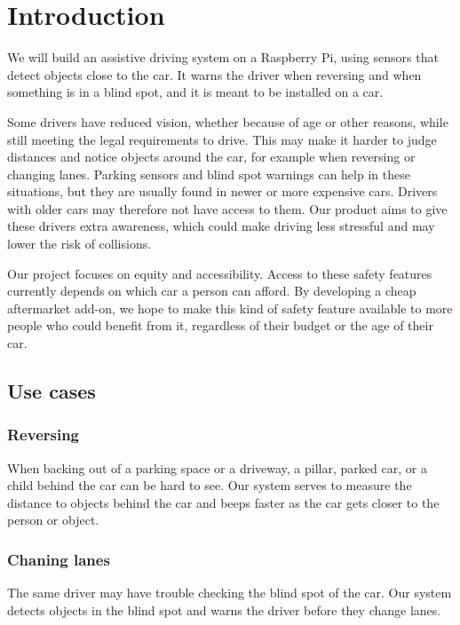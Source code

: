 \documentclass[12pt]{article}
\begin{document}
\thispagestyle{empty} %
\newpage
\tableofcontents
\clearpage
\section{Introduction}

We will build an assistive driving system on a Raspberry Pi, using sensors that detect objects close to the car. It warns the driver when reversing and when something is in a blind spot, and it is meant to be installed on a car.

Some drivers have reduced vision, whether because of age or other reasons, while still meeting the legal requirements to drive. This may make it harder to judge distances and notice objects around the car, for example when reversing or changing lanes. Parking sensors and blind spot warnings can help in these situations, but they are usually found in newer or more expensive cars. Drivers with older cars may therefore not have access to them. Our product aims to give these drivers extra awareness, which could make driving less stressful and may lower the risk of collisions.

Our project focuses on equity and accessibility. Access to these safety features currently depends on which car a person can afford. By developing a cheap aftermarket add-on, we hope to make this kind of safety feature available to more people who could benefit from it, regardless of their budget or the age of their car. 
\subsection{Use cases}
\subsubsection{Reversing}
When backing out of a parking space or a driveway, a pillar, parked car, or a child behind the car can be hard to see. Our system serves to measure the distance to objects behind the car and beeps faster as the car gets closer to the person or object.

\subsubsection{Chaning lanes}
The same driver may have trouble checking the blind spot of the car. Our system detects objects in the blind spot and warns the driver before they change lanes.
\clearpage
\end{document}
